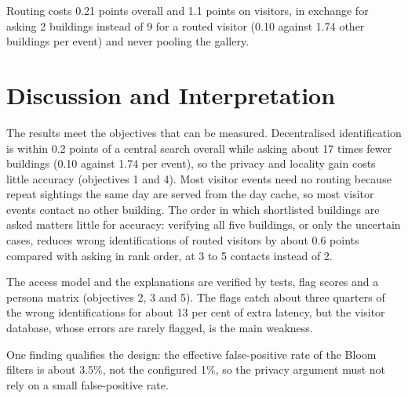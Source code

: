 \documentclass[12pt,a4paper,oneside]{report}
\begin{document}
Routing costs 0.21 points overall and 1.1 points on visitors, in exchange for asking 2 buildings instead of 9 for a routed visitor (0.10 against 1.74 other buildings per event) and never pooling the gallery.


\section{Discussion and Interpretation}
The results meet the objectives that can be measured. Decentralised identification is within 0.2 points of a central search overall while asking about 17 times fewer buildings (0.10 against 1.74 per event), so the privacy and locality gain costs little accuracy (objectives 1 and 4). Most visitor events need no routing because repeat sightings the same day are served from the day cache, so most visitor events contact no other building. The order in which shortlisted buildings are asked matters little for accuracy: verifying all five buildings, or only the uncertain cases, reduces wrong identifications of routed visitors by about 0.6 points compared with asking in rank order, at 3 to 5 contacts instead of 2.

The access model and the explanations are verified by tests, flag scores and a persona matrix (objectives 2, 3 and 5). The flags catch about three quarters of the wrong identifications for about 13 per cent of extra latency, but the visitor database, whose errors are rarely flagged, is the main weakness.

One finding qualifies the design: the effective false-positive rate of the Bloom filters is about 3.5\%, not the configured 1\%, so the privacy argument must not rely on a small false-positive rate.
\end{document}
